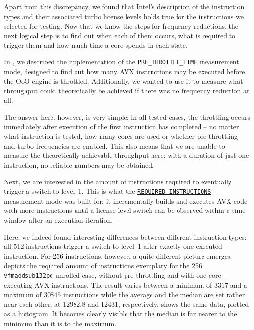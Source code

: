 Apart from this discrepancy, we found that Intel's description of the instruction types and their associated turbo license levels holds true for the instructions we selected for testing. Now that we know the steps for frequency reductions, the next logical step is to find out when each of them occurs, what is required to trigger them and how much time a core spends in each state.

In , we described the implementation of the \texttt{PRE\_THROTTLE\_TIME} measurement mode, designed to find out how many \gls{AVX} instructions may be executed before the \acrlong{OoO} engine is throttled. Additionally, we wanted to use it to measure what throughput could theoretically be achieved if there was no frequency reduction at all.

The answer here, however, is very simple: in all tested cases, the throttling occurs immediately after execution of the first instruction has completed -- no matter what instruction is tested, how many cores are used or whether pre-throttling and turbo frequencies are enabled. This also means that we are unable to measure the theoretically achievable throughput here: with a duration of just one instruction, no reliable numbers may be obtained.

Next, we are interested in the amount of instructions required to eventually trigger a switch to level~1. This is what the \hyperref[sec:analysis:design:measurementmodes:nonavxtime]{\texttt{REQUIRED\_INSTRUCTIONS}} measurement mode was built for: it incrementally builds and executes \gls{AVX} code with more instructions until a license level switch can be observed within a time window after an execution iteration.

Here, we indeed found interesting differences between different instruction types: all \SI[number-unit-product=-]{512}{\bit} instructions trigger a switch to level~1 after exactly one executed instruction. For \SI[number-unit-product=-]{256}{\bit} instructions, however, a quite different picture emerges:  depicts the required amount of instructions exemplary for the \SI[number-unit-product=-]{256}{\bit} \texttt{vfmaddsub132pd} unrolled case, without pre-throttling and with one core executing \gls{AVX} instructions. The result varies between a minimum of $3317$ and a maximum of $30845$ instructions while the average and the median are set rather near each other, at $12982.8$ and $12431$, respectively.  shows the same data, plotted as a histogram. It becomes clearly visible that the median is far nearer to the minimum than it is to the maximum.

